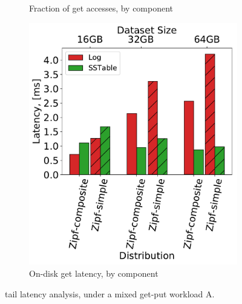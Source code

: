 {{\begin{figure}[tb]
\begin{subfigure}{0.32\linewidth}
\caption{Fraction of get accesses, by component}
\label{fig:tail_latency:dist}
\end{subfigure}
\begin{subfigure}{0.31\linewidth}
\includegraphics[width=\textwidth]{figs/Latency_A.pdf}
\caption{On-disk get latency, by component}
\label{fig:tail_latency:disk}
\end{subfigure}
\label{fig:tail_latency}
\caption{{\sys\/ tail latency analysis, under a mixed get-put workload A.}}
\end{figure}
}

}
